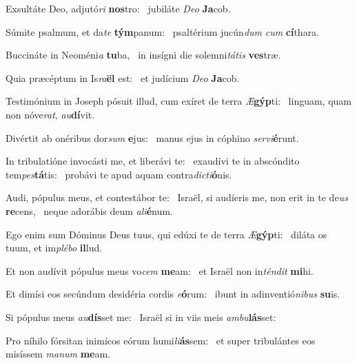 \item Exsultáte Deo, adjutó\textit{ri} \textbf{nos}tro:~\psstar{} jubiláte \textit{Deo} \textbf{Ja}cob.

\item Súmite psalmum, et da\textit{te} \textbf{tým}panum:~\psstar{} psaltérium jucún\textit{dum} \textit{cum} \textbf{cí}thara.

\item Buccináte in Neoméni\textit{a} \textbf{tu}ba,~\psstar{} in insígni die solemni\textit{tátis} \textbf{ves}træ.

\item Quia præcéptum in Is\textit{ra}\textbf{ël} est:~\psstar{} et judícium \textit{Deo} \textbf{Ja}cob.

\item Testimónium in Joseph pósuit illud, cum exíret de terra \textit{Æ}\textbf{gýp}ti:~\psstar{} linguam, quam non nóve\textit{rat}, \textit{au}\textbf{dí}vit.

\item Divértit ab onéribus dor\textit{sum} \textbf{e}jus:~\psstar{} manus ejus in cóphino \textit{servi}\textbf{é}runt.

\item In tribulatióne invocásti me, et liberávi te:~\pscross{} exaudívi te in abscóndito tem\textit{pes}\textbf{tá}tis:~\psstar{} probávi te apud aquam contra\textit{dicti}\textbf{ó}nis.

\item Audi, pópulus meus, et contestábor te:~\pscross{} Israël, si audíeris me, non erit in te de\textit{us} \textbf{re}cens,~\psstar{} neque adorábis deum \textit{ali}\textbf{é}num.

\item Ego enim sum Dóminus Deus tuus, qui edúxi te de terra \textit{Æ}\textbf{gýp}ti:~\psstar{} diláta os tuum, et im\textit{plébo} \textbf{il}lud.

\item Et non audívit pópulus meus vo\textit{cem} \textbf{me}am:~\psstar{} et Israël non in\textit{téndit} \textbf{mi}hi.

\item Et dimísi eos secúndum desidéria cordis \textit{e}\textbf{ó}rum:~\psstar{} ibunt in adinventió\textit{nibus} \textbf{su}is.

\item Si pópulus meus \textit{au}\textbf{dís}set me:~\psstar{} Israël si in viis meis \textit{ambu}\textbf{lás}set:

\item Pro níhilo fórsitan inimícos eórum humi\textit{li}\textbf{ás}sem:~\psstar{} et super tribulántes eos misíssem \textit{manum} \textbf{me}am.

